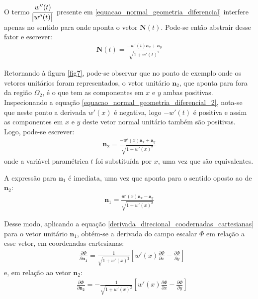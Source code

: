 O termo $\displaystyle\frac{w''(t)}{\abs{w''(t)}} $ presente em \eqref{equacao_normal_geometria_diferencial} interfere apenas no sentido para
onde aponta o vetor $\mathbf{N}(t)$. Pode-se então abstrair desse fator e escrever:
\begin{align}
\mathbf{N}(t) = \frac{ -w'(t)\mathbf{a}_x + \mathbf{a}_y }{\sqrt{ 1 + w'(t)^2 }} \label{equacao_normal_geometria_diferencial_2}
\end{align}

Retornando à figura \ref{fig7}, pode-se observar que no ponto de exemplo onde os vetores unitários foram representados, o vetor unitário $\mathbf{n}_2$,
que aponta para fora da região $\Omega_2$, é o que tem as componentes em $x$ e $y$ ambas positivas. Inspecionando a equação \eqref{equacao_normal_geometria_diferencial_2},
nota-se que neste ponto a derivada $w'(x)$ é negativa, logo $-w'(t)$ é positiva e assim as componentes em $x$ e $y$ deste vetor normal unitário também são positivas. Logo, 
pode-se escrever:
\begin{align}
\mathbf{n}_2 = \frac{ -w'(x)\mathbf{a}_x + \mathbf{a}_y }{\sqrt{ 1 + w'(x)^2 }}
\end{align}
onde a variável paramétrica $t$ foi substituída por $x$, uma vez que são equivalentes.

A expressão para $\mathbf{n}_1$ é imediata, uma vez que aponta para o sentido oposto ao de $\mathbf{n}_2$:
\begin{align}
\mathbf{n}_1 = \frac{ w'(x)\mathbf{a}_x - \mathbf{a}_y }{\sqrt{ 1 + w'(x)^2 }}
\end{align}

Desse modo, aplicando a equação \eqref{derivada_direcional_coodernadas_cartesianas} para o vetor unitário $\mathbf{n}_1$, obtém-se a derivada do campo escalar $\Phi$
em relação a esse vetor, em coordenadas cartesianas: 
\begin{align}
& \frac{\partial\Phi}{\partial\mathbf{n_1}} = \frac{1}{\sqrt{1 + w'(x)^2}}\left[w'(x)\frac{\partial \Phi}{\partial x} - \frac{\partial \Phi}{\partial y}\right]
\label{derivada_direcional_para_n1}
\end{align} 
e, em relação ao vetor $\mathbf{n}_2$:
\begin{align}
& \frac{\partial\Phi}{\partial\mathbf{n_2}} = -\frac{1}{\sqrt{1 + w'(x)^2}}\left[w'(x)\frac{\partial \Phi}{\partial x} - \frac{\partial \Phi}{\partial y}\right]
\label{derivada_direcional_para_n2}
\end{align} 

